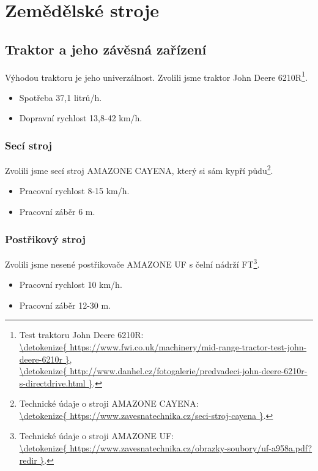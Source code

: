 
\section{Zemědělské stroje}

\subsection{Traktor a jeho závěsná zařízení}
Výhodou traktoru je jeho univerzálnost. Zvolili jsme traktor John Deere 6210R\footnote{Test traktoru John Deere 6210R: \\\url{\detokenize{
https://www.fwi.co.uk/machinery/mid-range-tractor-test-john-deere-6210r
}},
\\\url{\detokenize{
http://www.danhel.cz/fotogalerie/predvadeci-john-deere-6210r-s-directdrive.html
}}.}.
\begin{itemize}
  \item Spotřeba 37,1 litrů/h.
  \item Dopravní rychlost 13,8-42 km/h.
\end{itemize}

\subsubsection{Secí stroj}
Zvolili jsme secí stroj AMAZONE CAYENA, který si sám kypří půdu\footnote{Technické údaje o stroji AMAZONE CAYENA: \\\url{\detokenize{
https://www.zavesnatechnika.cz/seci-stroj-cayena
}}.}.
\begin{itemize}
  \item Pracovní rychlost 8-15 km/h.
  \item Pracovní záběr 6 m.
\end{itemize}

\subsubsection{Postřikový stroj}
Zvolili jsme nesené postřikovače AMAZONE UF s čelní nádrží FT\footnote{Technické údaje o stroji AMAZONE UF: \\\url{\detokenize{
https://www.zavesnatechnika.cz/obrazky-soubory/uf-a958a.pdf?redir
}}.}.
\begin{itemize}
  \item Pracovní rychlost 10 km/h.
  \item Pracovní záběr 12-30 m.
\end{itemize}

